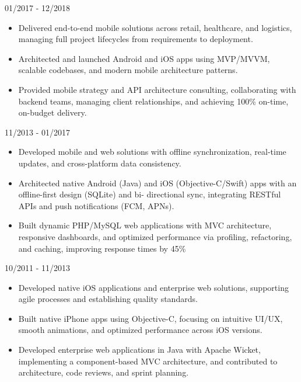 \documentclass{mycv}
\begin{document}
{01/2017 - 12/2018}

\begin{itemize}
    \item Delivered end-to-end mobile solutions across retail, healthcare, and logistics, managing full project lifecycles from
requirements to deployment.
    \item Architected and launched Android and iOS apps using MVP/MVVM, scalable codebases, and modern mobile
architecture patterns.
    \item Provided mobile strategy and API architecture consulting, collaborating with backend teams, managing client
relationships, and achieving 100\% on-time, on-budget delivery.
\end{itemize}

{11/2013 - 01/2017}

\begin{itemize}
    \item Developed mobile and web solutions with offline synchronization, real-time updates, and cross-platform data
consistency.
    \item Architected native Android (Java) and iOS (Objective-C/Swift) apps with an offline-first design (SQLite) and bi-
directional sync, integrating RESTful APIs and push notifications (FCM, APNs).
    \item Built dynamic PHP/MySQL web applications with MVC architecture, responsive dashboards, and optimized performance
via profiling, refactoring, and caching, improving response times by 45\%
\end{itemize}

{10/2011 - 11/2013}

\begin{itemize}
    \item Developed native iOS applications and enterprise web solutions, supporting agile processes and establishing quality
standards.
    \item Built native iPhone apps using Objective-C, focusing on intuitive UI/UX, smooth animations, and optimized performance
across iOS versions.
    \item Developed enterprise web applications in Java with Apache Wicket, implementing a component-based MVC architecture,
and contributed to architecture, code reviews, and sprint planning.
\end{itemize}
\end{document}
